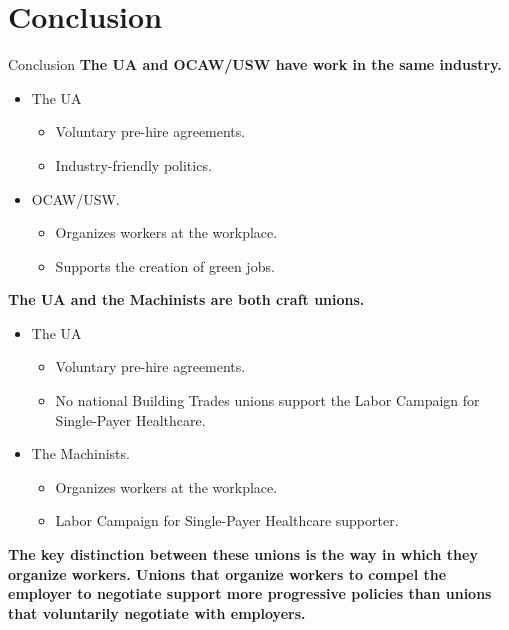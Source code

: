 \documentclass{beamer}
\begin{document}
\section{Conclusion}
\begin{frame}{Conclusion}
\textbf{The UA and OCAW/USW have work in the same industry.}
\begin{itemize}
	\item The UA
	\begin{itemize}
		\item Voluntary pre-hire agreements.
		\item Industry-friendly politics.
  	\end{itemize}
  	\item OCAW/USW.
  	\begin{itemize}
  		\item Organizes workers at the workplace.
  		\item Supports the creation of green jobs.
  	\end{itemize}
\end{itemize}
  		
\textbf{The UA and the Machinists are both craft unions.}
\begin{itemize}
	\item The UA
	\begin{itemize}
		\item Voluntary pre-hire agreements.
		\item No national Building Trades unions support the Labor Campaign for Single-Payer Healthcare.
	\end{itemize}
  	\item The Machinists.
  	\begin{itemize}
  		\item Organizes workers at the workplace.
  		\item Labor Campaign for Single-Payer Healthcare supporter.
  	\end{itemize}
\end{itemize}
\textbf{The key distinction between these unions is the way in which they organize workers.\newline\newline
Unions that organize workers to compel the employer to negotiate support more progressive policies than unions that voluntarily negotiate with employers.}
\end{frame}

\end{document}
